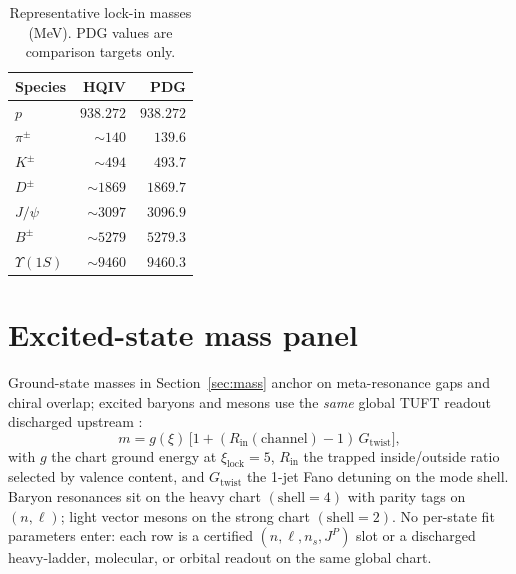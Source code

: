 \documentclass[11pt]{amsart}
\begin{document}
\begin{table}[ht]
\centering
\caption{Representative lock-in masses (MeV). PDG values \cite{pdg2024} are
comparison targets only.}
\label{tab:mass-panel}
\begin{tabular}{@{}lrr@{}}
\toprule
Species & HQIV & PDG \cite{pdg2024} \\
\midrule
$p$ & $938.272$ & $938.272$ \\
$\pi^\pm$ & $\sim 140$ & $139.6$ \\
$K^\pm$ & $\sim 494$ & $493.7$ \\
$D^\pm$ & $\sim 1869$ & $1869.7$ \\
$J/\psi$ & $\sim 3097$ & $3096.9$ \\
$B^\pm$ & $\sim 5279$ & $5279.3$ \\
$\Upsilon(1S)$ & $\sim 9460$ & $9460.3$ \\
\bottomrule
\end{tabular}
\end{table}

\section{Excited-state mass panel}
\label{sec:excited-masses}

Ground-state masses in Section~\ref{sec:mass} anchor on meta-resonance gaps and
chiral overlap; excited baryons and mesons use the \emph{same} global TUFT readout
discharged upstream \cite{hqiv-tuft-sm-lagrangian-paper}:
\begin{equation}
  m = g(\xi)\,\bigl[1 + (R_{\mathrm{in}}(\mathrm{channel})-1)\,G_{\mathrm{twist}}\bigr],
\end{equation}
with $g$ the chart ground energy at $\xi_{\mathrm{lock}}=5$, $R_{\mathrm{in}}$ the
trapped inside/outside ratio selected by valence content, and $G_{\mathrm{twist}}$ the
1-jet Fano detuning on the mode shell.
Baryon resonances sit on the heavy chart $(\mathrm{shell}=4)$ with parity tags on
$(n,\ell)$; light vector mesons on the strong chart $(\mathrm{shell}=2)$.
No per-state fit parameters enter: each row is a certified $(n,\ell,n_s,J^P)$ slot
or a discharged heavy-ladder, molecular, or orbital readout on the same global chart.
\end{document}
